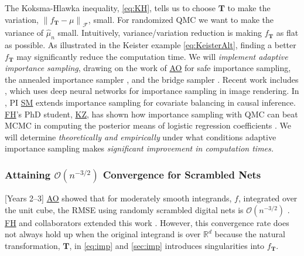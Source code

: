 \documentclass[11pt]{NSFamsart}
\newcommand{\FH}{\hyperlink{FHlink}{FH}\xspace}
\newcommand{\SM}{\hyperlink{SMlink}{SM}\xspace}
\newcommand{\AO}{\hyperlink{AOlink}{AO}\xspace}
\newcommand{\KZ}{\hyperlink{KZlink}{KZ}\xspace}
\newcommand{\reals}{{\mathbb{R}}}
\newcommand{\bT}{{\boldsymbol{T}}}
\newcommand{\calf}{{\mathcal{F}}}
\newcommand{\norm}[2][{}]{\ensuremath{\left \lVert #2 \right \rVert}_{#1}}
\newcommand{\Order}{\mathcal{O}}
\newcommand{\hmu}{\hat{\mu}}
\begin{document}
The Koksma-Hlawka inequality, \eqref{eq:KH}, tells us to choose $\bT$ to make the variation, $\norm[\calf]{f_{\bT} - \mu}$, small.  For randomized QMC we want to make the variance of $\hmu_n$ small.  Intuitively, variance/variation reduction is making $f_{\bT}$ as flat as possible. As illustrated in the Keister example \eqref{eq:KeisterAlt}, finding a better $f_{\bT}$ may significantly reduce the computation time.  We will \emph{implement adaptive importance sampling}, drawing on the work of  
\AO \cite{owen2000safe} for safe importance sampling, the  annealed importance sampler \cite{neal2001annealed}, and the bridge sampler \cite{gelman1998simulating}.  Recent work includes \cite{mueller2019neural}, which uses deep neural networks for importance sampling in image rendering.  In \cite{huling2020energy}, PI \SM extends importance sampling for covariate balancing in causal inference.  \FH's PhD student, \KZ, has shown how importance sampling with QMC can beat MCMC in computing the posterior means of logistic regression coefficients \cite{Zha21a}.  We will determine \emph{theoretically and empirically} under what conditions adaptive importance sampling makes \emph{significant improvement in computation times.}

\subsubsection{Attaining $\Order(n^{-3/2})$ Convergence for Scrambled Nets} \label{sec:threehalves}
[Years 2--3] \AO showed that for moderately smooth integrands, $f$, integrated over the unit cube, the RMSE using randomly scrambled digital nets is $\Order(n^{-3/2})$ \cite{Owe97}.  \FH and collaborators extended this work \cite{HicYue00,HeiHicYue02a}.  However, this convergence rate does not always hold up when the original integrand is over $\reals^d$ because the natural transformation, $\bT$,  in \eqref{eq:imp} and \cref{sec:imp} introduces singularities into $f_{\bT}$.
\end{document}
